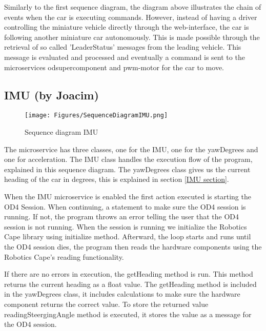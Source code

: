 \documentclass[12pt]{article}
\begin{document}
Similarly to the first sequence diagram, the diagram above illustrates the chain of events when the car is executing commands. However, instead of having a driver controlling the miniature vehicle directly through the web-interface, the car is following another miniature car autonomously. This is made possible through the retrieval of so called 'LeaderStatus' messages from the leading vehicle. This message is evaluated and processed and eventually a command is sent to the microservices odsupercomponent and pwm-motor for the car to move.

\pagebreak

\subsection{IMU (by Joacim)}

\FloatBarrier %
\begin{figure}[ht!]
\centering
\texttt{[image: Figures/SequenceDiagramIMU.png]}
\caption{Sequence diagram IMU}
\label{fig:sd_imu}
\end{figure}
\FloatBarrier %

The microservice has three classes, one for the IMU, one for the yawDegrees and one for acceleration. The IMU class handles the execution flow of the program, explained in this sequence diagram. The yawDegrees class gives us the current heading of the car in degrees, this is explained in section \ref{IMU section}.

When the IMU microservice is enabled the first action executed is starting the OD4 Session. When continuing, a statement to make sure the OD4 session is running. If not, the program throws an error telling the user that the OD4 session is not running. When the session is running we initialize the Robotics Cape library\cite{robotics cape} using initialize method. Afterward, the loop starts and runs until the OD4 session dies, the program then reads the hardware components using the Robotics Cape's reading functionality.  

If there are no errors in execution, the getHeading method is run. This method returns the current heading as a float value. The getHeading method is included in the yawDegrees class, it includes calculations to make sure the hardware component returns the correct value. 
To store the returned value readingSteergingAngle method is executed, it stores the value as a message for the OD4 session.
\end{document}
